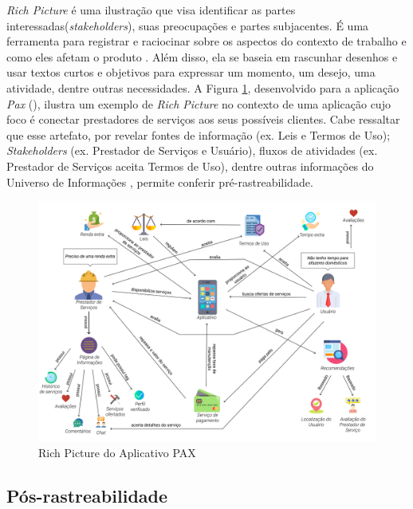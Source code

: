 \label{sec:rich_picture}

\textit{Rich Picture} é uma ilustração que visa identificar as partes interessadas(\textit{stakeholders}), suas preocupações e partes subjacentes. É uma ferramenta para registrar e raciocinar sobre os aspectos do contexto de trabalho e como eles afetam o produto  \cite{10.1145/274430.274434}. Além disso, ela se baseia em rascunhar desenhos e usar textos curtos e objetivos para expressar um momento, um desejo, uma atividade, dentre outras necessidades. A Figura \ref{fig:rich_picture}, desenvolvido para a aplicação \textit{Pax} (), ilustra um exemplo de \textit{Rich Picture} no contexto de uma aplicação cujo foco é conectar prestadores de serviços aos seus possíveis clientes. Cabe ressaltar que esse artefato, por revelar fontes de informação (ex. Leis e Termos de Uso); \textit{Stakeholders} (ex. Prestador de Serviços e Usuário), fluxos de atividades (ex. Prestador de Serviços aceita Termos de Uso), dentre outras informações do Universo de Informações \cite{leite2007livro}, permite conferir pré-rastreabilidade.

\begin{figure}[htb]
    \begin{center}
        \caption{Rich Picture do Aplicativo PAX}
        \label{fig:rich_picture}
        \includegraphics[scale=0.31]{figuras/Embasamento/rp_geral_v3.png}
    \end{center}
\end{figure}

\subsection{Pós-rastreabilidade}

